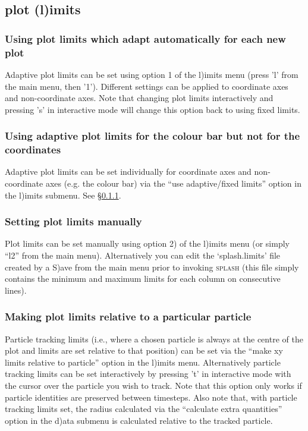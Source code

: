 \documentclass[a4paper,10pt]{article}
\newcommand{\splash}{\textsc{splash }}
\begin{document}
\subsection{plot (l)imits}

\subsubsection{ Using plot limits which adapt automatically for each new plot}
\label{sec:adapt}
 Adaptive plot limits can be set using option 1 of the l)imits menu (press 'l' from the main menu, then '1'). Different settings can be applied to coordinate axes and non-coordinate axes. Note that changing plot limits interactively and pressing 's' in interactive mode will change this option back to using fixed limits.

\subsubsection{ Using adaptive plot limits for the colour bar but not for the coordinates}
 Adaptive plot limits can be set individually for coordinate axes and non-coordinate axes (e.g. the colour bar) via the ``use adaptive/fixed limits'' option in the l)imits submenu. See \S\ref{sec:adapt}. 

\subsubsection{ Setting plot limits manually}
 Plot limits can be set manually using option 2) of the l)imits menu (or simply ``l2'' from the main menu). Alternatively you can edit the `splash.limits' file created by a S)ave from the main menu prior to invoking \splash (this file simply contains the minimum and maximum limits for each column on consecutive lines).

\subsubsection{ Making plot limits relative to a particular particle}
\label{sec:track}
 Particle tracking limits (i.e., where a chosen particle is always at the centre of the plot and limits are set relative to that position) can be set via the ``make xy limits relative to particle'' option in the l)imits menu. Alternatively particle tracking limits can be set interactively by pressing 't' in interactive mode with the cursor over the particle you wish to track. Note that this option only works if particle identities are preserved between timesteps. Also note that, with particle tracking limits set, the radius calculated via the ``calculate extra quantities'' option in the d)ata submenu is calculated relative to the tracked particle.
\end{document}
